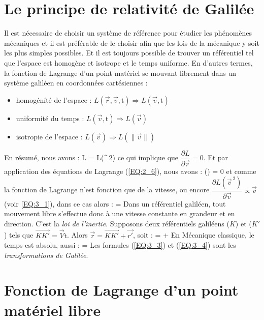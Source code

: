 \section{Le principe de relativit\'e de Galil\'ee}

Il est n\'ecessaire de choisir un syst\`eme de r\'ef\'erence pour \'etudier les ph\'enom\`enes m\'ecaniques et il est pr\'ef\'erable de le choisir afin que les lois de la m\'ecanique y soit les plus simples possibles. Et il est toujours possible de trouver un r\'ef\'erentiel tel que l'espace est homog\`ene et isotrope et le temps uniforme. En d'autres termes, la fonction de Lagrange d'un point mat\'eriel se mouvant librement dans un syst\`eme galil\'een en coordonn\'ees cart\'esiennes :
\begin{itemize}
	\item homog\'en\'it\'e de l'espace : $L(\vec{r},\vec{v},\mathrm{t}) \Rightarrow L(\vec{v},\mathrm{t})$
	\item uniformit\'e du temps : $L(\vec{v},\mathrm{t}) \Rightarrow L(\vec{v})$
	\item isotropie de l'espace : $L(\vec{v}) \Rightarrow L(\lVert\vec{v}\rVert)$
\end{itemize}
En r\'esum\'e, nous avons :
\be
	L = L(^{\,2}) \label{EQ:3_1}
\ee
ce qui implique que $\dfrac{\partial L}{\partial \vec{r}} = 0$. Et par application des \'equations de Lagrange (\ref{EQ:2_6}), nous avons :
\be
	\left(\right) = 0
\ee
et comme la fonction de Lagrange n'est fonction que de la vitesse, ou encore $\dfrac{\partial L({\vec{v}}^{\,2})}{\partial \vec{v}} \propto \vec{v}$ (voir \ref{EQ:3_1}), dans ce cas alors :
\be
	 =  \label{EQ:3_2}
\ee
Dans un r\'ef\'erentiel galil\'een, tout mouvement libre s'effectue donc \`a une vitesse constante en grandeur et en direction. C'est la \emph{loi de l'inertie}. Supposons deux r\'ef\'erentiels galil\'eens ($K$) et ($K'$) tels que $\vec{KK'}=\vec{V}\mathrm{t}$. Alors $\vec{r}=\vec{KK'}+\vec{r'}$, soit :
\be
	 =  +  \label{EQ:3_3}
\ee
En M\'ecanique classique, le temps est absolu, aussi :
\be
	 =  \label{EQ:3_4}
\ee
Les formules (\ref{EQ:3_3}) et (\ref{EQ:3_4}) sont les \emph{transformations de Galil\'ee}.

\section{Fonction de Lagrange d'un point mat\'eriel libre}

